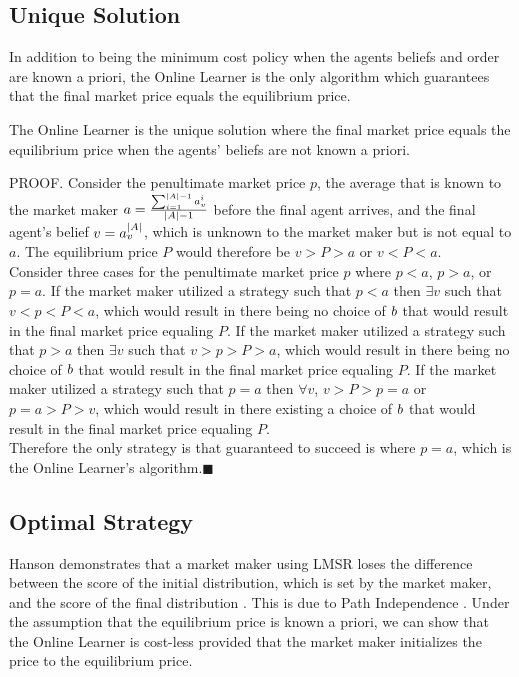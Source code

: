 \subsection{Unique Solution}
In addition to being the minimum cost policy when the agents beliefs and order are known a priori, the Online Learner is the only algorithm which guarantees that the final market price equals the equilibrium price. \\

\begin{theorem}
The Online Learner is the unique solution where the final market price equals the equilibrium price when the agents' beliefs are not known a priori.
\end{theorem}

PROOF. Consider the penultimate market price $p$, the average that is known to the market maker $a = \frac{\sum_{i=1}^{|A|-1} a^{i}_{v}}{|A|-1}$ before the final agent arrives, and the final agent's belief $v = a^{|A|}_{v}$, which is unknown to the market maker but is not equal to $a$. The equilibrium price $P$ would therefore be $v > P > a$ or $v < P < a$.\\

Consider three cases for the penultimate market price $p$ where $p < a$, $p > a$, or $p = a$. If the market maker utilized a strategy such that $p < a$ then $\exists v$ such that $v < p < P < a$, which would result in there being no choice of $b$ that would result in the final market price equaling $P$. If the market maker utilized a strategy such that $p > a$ then $\exists v$ such that $v > p > P > a$, which would result in there being no choice of $b$ that would result in the final market price equaling $P$. If the market maker utilized a strategy such that $p = a$ then $\forall v$, $v > P > p = a$ or $p = a > P > v$, which would result in there existing a choice of $b$ that would result in the final market price equaling $P$.\\

Therefore the only strategy is that guaranteed to succeed is where $p=a$, which is the Online Learner's algorithm.$\blacksquare$\\

\subsection{Optimal Strategy}
Hanson demonstrates that a market maker using LMSR loses the difference between the score of the initial distribution, which is set by the market maker, and the score of the final distribution \cite{Hanson2003}. This is due to Path Independence \cite{Othman:2013:PLA:2509413.2509414}. Under the assumption that the equilibrium price is known a priori, we can show that the Online Learner is cost-less provided that the market maker initializes the price to the equilibrium price. \\

